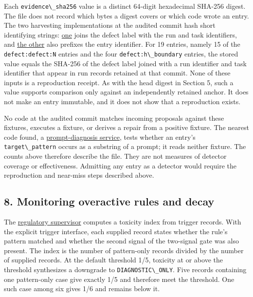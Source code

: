 \documentclass[
  11pt,
]{article}
\newcommand{\passthrough}[1]{#1}
\begin{document}
Each \passthrough{\lstinline!evidence\_sha256!} value is a distinct
64-digit hexadecimal SHA-256 digest. The file does not record which
bytes a digest covers or which code wrote an entry. The two harvesting
implementations at the audited commit hash short identifying strings:
\href{https://github.com/dbccpage/the_symbol_game/blob/52cb5457f6c485ba548cfd292f6012a941ed22cf/moscow/domain/immune/seeder.py}{one}
joins the defect label with the run and task identifiers, and
\href{https://github.com/dbccpage/the_symbol_game/blob/52cb5457f6c485ba548cfd292f6012a941ed22cf/operations/domain/symbol_game_bridge/pharmacy_seeder.py}{the
other} also prefixes the entry identifier. For 19 entries, namely 15 of
the \passthrough{\lstinline!defect:defect:N!} entries and the four
\passthrough{\lstinline!defect:h\_boundary!} entries, the stored value
equals the SHA-256 of the defect label joined with a run identifier and
task identifier that appear in run records retained at that commit. None
of these inputs is a reproduction receipt. As with the head digest in
Section 5, such a value supports comparison only against an
independently retained anchor. It does not make an entry immutable, and
it does not show that a reproduction exists.

No code at the audited commit matches incoming proposals against these
fixtures, executes a fixture, or derives a repair from a positive
fixture. The nearest code found, a
\href{https://github.com/dbccpage/the_symbol_game/blob/52cb5457f6c485ba548cfd292f6012a941ed22cf/external_application/prompt_doctor/use_cases/repair_service.py}{prompt-diagnosis
service}, tests whether an entry's
\passthrough{\lstinline!target\_pattern!} occurs as a substring of a
prompt; it reads neither fixture. The counts above therefore describe
the file. They are not measures of detector coverage or effectiveness.
Admitting any entry as a detector would require the reproduction and
near-miss steps described above.

\subsection{8. Monitoring overactive rules and
decay}\label{monitoring-overactive-rules-and-decay}

The
\href{https://github.com/dbccpage/the_symbol_game/blob/52cb5457f6c485ba548cfd292f6012a941ed22cf/symbol_game/domain/immune/treg.py}{regulatory
supervisor} computes a toxicity index from trigger records. With the
explicit trigger interface, each supplied record states whether the
rule's pattern matched and whether the second signal of the two-signal
gate was also present. The index is the number of pattern-only records
divided by the number of supplied records. At the default threshold 1/5,
toxicity at or above the threshold synthesizes a downgrade to
\passthrough{\lstinline!DIAGNOSTIC\_ONLY!}. Five records containing one
pattern-only case give exactly 1/5 and therefore meet the threshold. One
such case among six gives 1/6 and remains below it.
\end{document}

